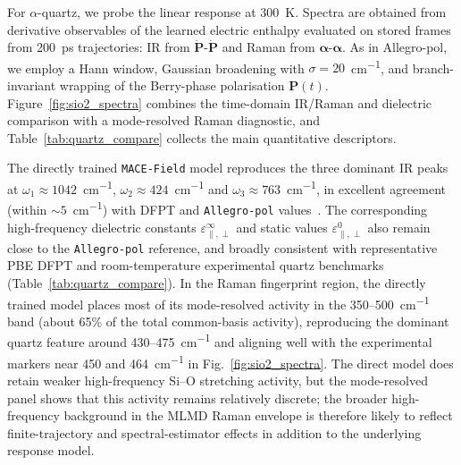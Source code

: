 \documentclass[aps,physrev,graphicx,amsmath,amssymb,
               reprint,superscriptaddress]{revtex4-2}
\begin{document}
For $\alpha$-quartz, we probe the linear response at 300~\si{K}. Spectra are obtained from derivative observables of the learned electric enthalpy evaluated on stored frames from 200~ps trajectories: IR from $\dot{\mathbf{P}}$-$\dot{\mathbf{P}}$ and Raman from $\boldsymbol{\alpha}$-$\boldsymbol{\alpha}$. As in Allegro-pol, we employ a Hann window, Gaussian broadening with $\sigma = 20$~\si{cm^{-1}}, and branch-invariant wrapping of the Berry-phase polarisation $\mathbf{P}(t)$. Figure~\ref{fig:sio2_spectra} combines the time-domain IR/Raman and dielectric comparison with a mode-resolved Raman diagnostic, and Table~\ref{tab:quartz_compare} collects the main quantitative descriptors.

The directly trained \texttt{MACE-Field} model reproduces the three dominant IR peaks at $\omega_1 \approx 1042$~\si{cm^{-1}}, $\omega_2 \approx 424$~\si{cm^{-1}} and $\omega_3 \approx 763$~\si{cm^{-1}}, in excellent agreement (within $\sim 5$~\si{cm^{-1}}) with DFPT and \texttt{Allegro-pol} values~\cite{allegro-pol-2025}. The corresponding high-frequency dielectric constants $\varepsilon_{\parallel,\perp}^{\infty}$ and static values $\varepsilon_{\parallel,\perp}^{0}$ also remain close to the \texttt{Allegro-pol} reference, and broadly consistent with representative PBE DFPT and room-temperature experimental quartz benchmarks (Table~\ref{tab:quartz_compare}). In the Raman fingerprint region, the directly trained model places most of its mode-resolved activity in the 350--500~\si{cm^{-1}} band (about 65\% of the total common-basis activity), reproducing the dominant quartz feature around 430--475~\si{cm^{-1}} and aligning well with the experimental~\cite{ENSLyonQuartzRaman} markers near 450 and 464~\si{cm^{-1}} in Fig.~\ref{fig:sio2_spectra}. The direct model does retain weaker high-frequency Si--O stretching activity, but the mode-resolved panel shows that this activity remains relatively discrete; the broader high-frequency background in the MLMD Raman envelope is therefore likely to reflect finite-trajectory and spectral-estimator effects in addition to the underlying response model.
\end{document}
